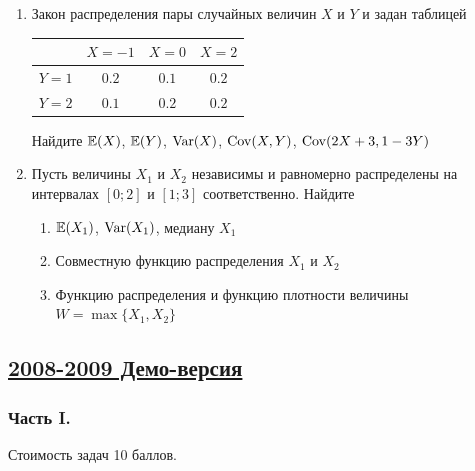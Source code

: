 \begin{enumerate}
\item Закон распределения пары случайных величин $X$ и $Y$ и задан таблицей

\begin{center}
\begin{tabular}{@{}cccc@{}}
\toprule
    & $X=-1$ & $X=0$ & $X=2$ \\ \midrule
$Y=1$ & $0.2$  & $0.1$ & $0.2$ \\
$Y=2$ & $0.1$  & $0.2$ & $0.2$ \\ \bottomrule
\end{tabular}
\end{center}

Найдите $\operatorname{\mathbb{E}}(X)$, $\operatorname{\mathbb{E}}(Y)$, $\operatorname{Var}(X)$, $\operatorname{Cov}(X,Y)$, $\operatorname{Cov}(2X+3,1-3Y)$

\item Пусть величины $X_1$ и $X_2$ независимы и равномерно распределены на интервалах
$[0;2]$ и $[1;3]$ соответственно. Найдите
\begin{enumerate}
\item $\operatorname{\mathbb{E}}(X_1)$, $\operatorname{Var}(X_1)$, медиану $X_1$
\item Совместную функцию распределения $X_1$ и $X_2$
\item Функцию распределения и функцию плотности величины $W=\max\{X_1,X_2\}$
\end{enumerate}
\end{enumerate}



\newpage
\subsection[2008-2009 Демо-версия]{\hyperref[sec:sol_kr_01_2008_2009_demo]{2008-2009 Демо-версия}}
\label{sec:kr_01_2008_2009_demo}


\subsubsection*{Часть I.}

Стоимость задач 10 баллов.

